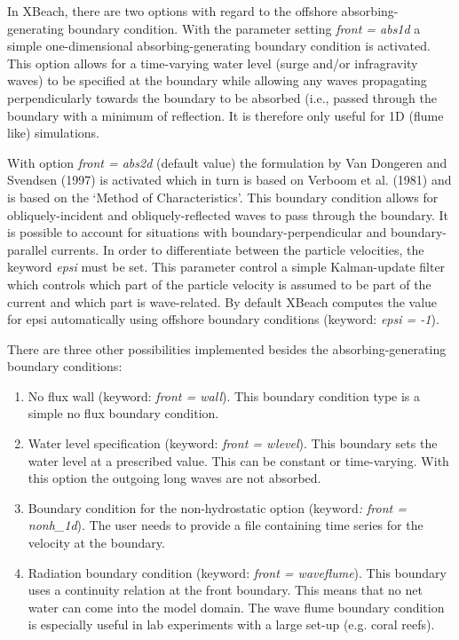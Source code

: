 \documentclass{article}
\begin{document}
\noindent 

\noindent In XBeach, there are two options with regard to the offshore absorbing-generating boundary condition. With the parameter setting \textit{front = abs1d }a simple one-dimensional absorbing-generating boundary condition is activated. This option allows for a time-varying water level (surge and/or infragravity waves) to be specified at the boundary while allowing any waves propagating perpendicularly towards the boundary to be absorbed (i.e., passed through the boundary with a minimum of reflection. It is therefore only useful for 1D (flume like) simulations.

\noindent 

\noindent With option \textit{front = abs2d }(default value) the formulation by Van Dongeren and Svendsen (1997) is activated which in turn is based on Verboom et al. (1981) and is based on the `Method of Characteristics'. This boundary condition allows for obliquely-incident and obliquely-reflected waves to pass through the boundary. It is possible to account for situations with boundary-perpendicular and boundary-parallel currents. In order to differentiate between the particle velocities, the keyword \textit{epsi} must be set. This parameter control a simple Kalman-update filter which controls which part of the particle velocity is assumed to be part of the current and which part is wave-related. By default XBeach computes the value for epsi automatically using offshore boundary conditions (keyword: \textit{epsi = -1}).

\noindent 

\noindent There are three other possibilities implemented besides the absorbing-generating boundary conditions:

\begin{enumerate}
\item  No flux wall (keyword: \textit{front = wall}). This boundary condition type is a simple no flux boundary condition.

\item  Water level specification (keyword: \textit{front = wlevel}). This boundary sets the water level at a prescribed value. This can be constant or time-varying. With this option the outgoing long waves are not absorbed.

\item  Boundary condition for the non-hydrostatic option (keyword\textit{: front = nonh\_1d}). The user needs to provide a file containing time series for the velocity at the boundary.

\item  Radiation boundary condition (keyword: \textit{front = waveflume}). This boundary uses a continuity relation at the front boundary. This means that no net water can come into the model domain. The wave flume boundary condition is especially useful in lab experiments with a large set-up (e.g. coral reefs).
\end{enumerate}
\end{document}
